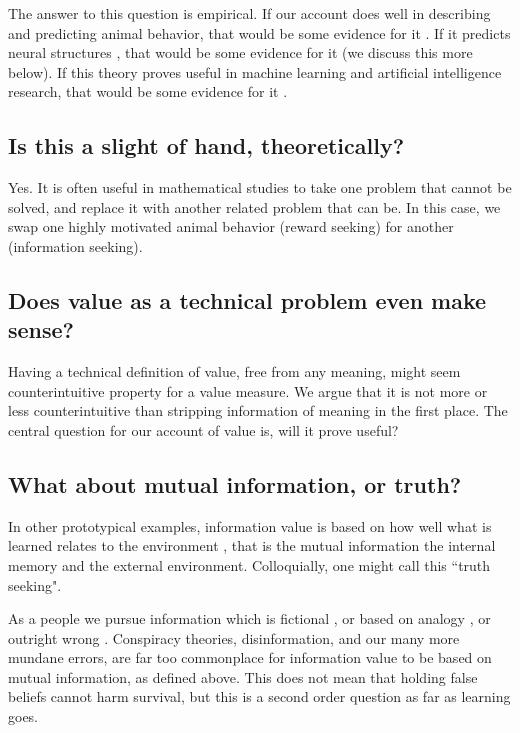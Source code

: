 The answer to this question is empirical. If our account does well in describing and predicting animal behavior, that would be some evidence for it \citep{Sumner2019,Wang2019,Jaegle2019,Gottlieb2018,Kidd2015,Berlyne1950,Colas2020a,Rahnev2018,Wilson2020,CogliatiDezza2017b,Berger-Tal2014}. If it predicts neural structures \citep{Cisek2019,Kobayashi2019}, that would be some evidence for it (we discuss this more below). If this theory proves useful in machine learning and artificial intelligence research, that would be some evidence for it \citep{Burda2018,Schmidhuber1991,deAbril2018,Fister2019,Lehman2011a,Stanley2004a,Colas2020,Cully2015,Wilson2020,Pathak2019}. 


\subsection*{Is this a slight of hand, theoretically?}
Yes. It is often useful in mathematical studies to take one problem that cannot be solved, and replace it with another related problem that can be. In this case, we swap one highly motivated animal behavior (reward seeking) for another (information seeking).


\subsection*{Does value as a technical problem even make sense?}
Having a technical definition of value, free from any meaning, might seem counterintuitive property for a value measure. We argue that it is not more or less counterintuitive than stripping information of meaning in the first  place. The central question for our account of value is, will it prove useful? 


\subsection*{What about mutual information, or truth?}
In other prototypical examples, information value is based on how well what is learned relates to the environment \citep{Behrens2007,Kolchinsky2018,Tishby2000}, that is the mutual information the internal memory and the external environment. Colloquially, one might call this ``truth seeking". 

As a people we pursue information which is fictional \citep{sternisko2020dark}, or based on analogy \citep{gentner1997reasoning}, or outright wrong \citep{loftus1989misinformation}. Conspiracy theories, disinformation, and our many more mundane errors, are far too commonplace for information value to be based on mutual information, as defined above. This does not mean that holding false beliefs cannot harm survival, but this is a second order question as far as learning goes. 


